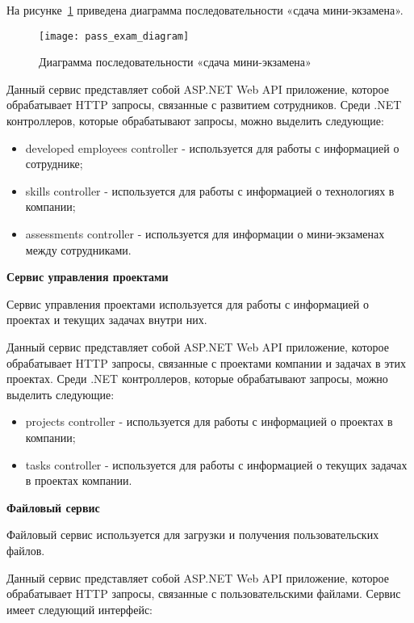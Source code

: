 На рисунке~\ref{fig:pass_exam_diagram} приведена диаграмма последовательности «сдача мини-экзамена». 

\begin{figure}[ht]
    \centering
    \texttt{[image: pass\_exam\_diagram]}
    \caption{Диаграмма последовательности «сдача мини-экзамена»}\label{fig:pass_exam_diagram}
\end{figure}

Данный сервис представляет собой ASP.NET Web API приложение, которое обрабатывает HTTP запросы, связанные с развитием сотрудников. Среди .NET контроллеров, которые обрабатывают запросы, можно выделить следующие:

\begin{itemize}
    \item developed employees controller - используется для работы с информацией о сотруднике;
    \item skills controller - используется для работы с информацией о технологиях в компании;
    \item assessments controller - используется для информации о мини-экза\-менах между сотрудниками.
\end{itemize}

\bigskip
\textbf{Сервис управления проектами}

Сервис управления проектами используется для работы с информацией о проектах и текущих задачах внутри них.

Данный сервис представляет собой ASP.NET Web API приложение, которое обрабатывает HTTP запросы, связанные с проектами компании и задачах в этих проектах. Среди .NET контроллеров, которые обрабатывают запросы, можно выделить следующие:

\begin{itemize}
    \item projects controller - используется для работы с информацией о проектах в компании;
    \item tasks controller - используется для работы с информацией о текущих задачах в проектах компании.
\end{itemize}

\bigskip
\textbf{Файловый сервис}

Файловый сервис используется для загрузки и получения пользовательских файлов.

Данный сервис представляет собой ASP.NET Web API приложение, которое обрабатывает HTTP запросы, связанные с пользовательскими файлами. Сервис имеет следующий интерфейс:

